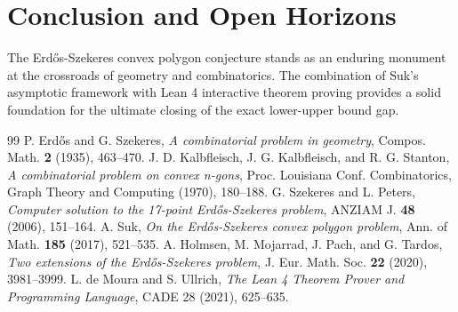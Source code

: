 \documentclass[11pt,a4paper]{article}
\theoremstyle{definition}
\begin{document}
\section{Conclusion and Open Horizons}
The Erd\H{o}s-Szekeres convex polygon conjecture stands as an enduring monument at the crossroads of geometry and combinatorics. The combination of Suk's asymptotic framework with Lean 4 interactive theorem proving provides a solid foundation for the ultimate closing of the exact lower-upper bound gap.

\begin{thebibliography}{99}
 P. Erd\H{o}s and G. Szekeres, \textit{A combinatorial problem in geometry}, Compos. Math. \textbf{2} (1935), 463--470.
 J. D. Kalbfleisch, J. G. Kalbfleisch, and R. G. Stanton, \textit{A combinatorial problem on convex n-gons}, Proc. Louisiana Conf. Combinatorics, Graph Theory and Computing (1970), 180--188.
 G. Szekeres and L. Peters, \textit{Computer solution to the 17-point Erd\H{o}s-Szekeres problem}, ANZIAM J. \textbf{48} (2006), 151--164.
 A. Suk, \textit{On the Erd\H{o}s-Szekeres convex polygon problem}, Ann. of Math. \textbf{185} (2017), 521--535.
 A. Holmsen, M. Mojarrad, J. Pach, and G. Tardos, \textit{Two extensions of the Erd\H{o}s-Szekeres problem}, J. Eur. Math. Soc. \textbf{22} (2020), 3981--3999.
 L. de Moura and S. Ullrich, \textit{The Lean 4 Theorem Prover and Programming Language}, CADE 28 (2021), 625--635.
\end{thebibliography}
\end{document}
